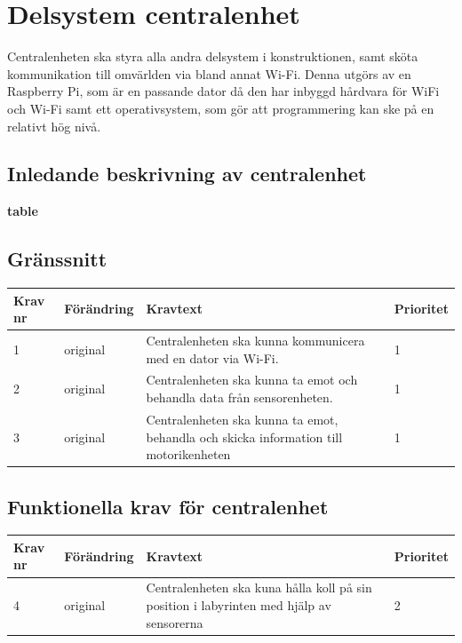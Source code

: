 \documentclass[a4paper,titlepage,12pt]{article}
\begin{document}
	\section{Delsystem centralenhet}
	Centralenheten ska styra alla andra delsystem i konstruktionen, samt sköta
	kommunikation till omvärlden via bland annat Wi-Fi. Denna utgörs av en Raspberry
	Pi, som är en passande dator då den har inbyggd hårdvara för WiFi och Wi-Fi samt
	ett operativsystem, som gör att programmering kan ske på en relativt hög nivå.
	\subsection{Inledande beskrivning av centralenhet}
	\textbf{table}
	\subsection{Gränssnitt}
	\begin{table}[h!]
		\label{tab:label}
		\begin{tabularx}{\textwidth}{|l|l|X|l|}
			\hline
			\textbf{Krav nr} & \textbf{Förändring} & \textbf{Kravtext} & \textbf{Prioritet} 
				\\ \hline

			1 & original & Centralenheten ska kunna kommunicera med en dator via Wi-Fi. & 1
				\\ \hline

			2 & original & Centralenheten ska kunna ta emot och behandla data från 
				sensorenheten.& 1
				\\ \hline

			3 & original & Centralenheten ska kunna ta emot, behandla och skicka 
				information  till motorikenheten& 1
				\\ \hline


		\end{tabularx}
	\end{table}

	\subsection{Funktionella krav för centralenhet}
	\begin{table}[h!]
		\label{tab:label}
		\begin{tabularx}{\textwidth}{|l|l|X|l|}
			\hline
			\textbf{Krav nr} & \textbf{Förändring} & \textbf{Kravtext} & \textbf{Prioritet} 
				\\ \hline

			4 & original & Centralenheten ska kuna hålla koll på sin position i labyrinten 
				med hjälp av sensorerna & 2
				\\ \hline
		\end{tabularx}
	\end{table}
\end{document}
